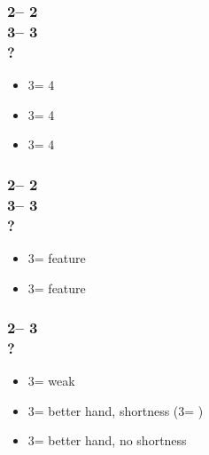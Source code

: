 \documentclass[12pt, a4paper]{report}
\begin{document}
{    \subsubsection*{2\hearts -- 2\nt\\
                    3\clubs -- 3\diams\\
                    ?}
    \begin{itemize}
        \item 3\hearts = 4\spades
        \item 3\spades = 4\clubs
        \item 3\nt = 4\diams
    \end{itemize}

    \subsubsection*{2\hearts -- 2\nt\\
                    3\diams -- 3\hearts\\
                    ?}
    \begin{itemize}
        \item 3\spades = \clubs feature
        \item 3\nt = \diams feature
    \end{itemize}

    \subsubsection*{2\hearts -- 3\diams\\
                    ?}
    \begin{itemize}
        \item 3\hearts = weak
        \item 3\spades = better hand, shortness (3\nt = \ahsf)
        \item 3\nt = better hand, no shortness
    \end{itemize}
}
\end{document}
